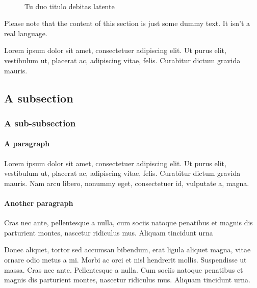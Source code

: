 \begin{figure}
\centering
{} \quad
{} \\
 \quad
{}
\caption[Tu duo titulo debitas latente]{Tu duo titulo debitas latente}
\label{fig:example}
\end{figure}

Please note that the content of this section is just some dummy text. It isn't a real language.

Lorem ipsum dolor sit amet, consectetuer adipiscing elit. Ut purus elit, vestibulum ut, placerat ac, adipiscing vitae, felis. Curabitur dictum gravida mauris.

\subsection*{A subsection}

\lipsum[2]

\subsubsection*{A sub-subsection}

\lipsum[7]

\paragraph{A paragraph}
Lorem ipsum dolor sit amet, consectetuer adipiscing elit. Ut purus elit, vestibulum ut, placerat ac, adipiscing vitae, felis. Curabitur dictum gravida mauris. Nam arcu libero, nonummy eget, consectetuer id, vulputate a, magna.

\paragraph{Another paragraph}
Cras nec ante, pellentesque a nulla, cum sociis natoque penatibus et magnis dis parturient montes, nascetur ridiculus mus. Aliquam tincidunt urna

\bigskip

Donec aliquet, tortor sed accumsan bibendum, erat ligula aliquet magna, vitae ornare odio metus a mi. Morbi ac orci et nisl hendrerit mollis. Suspendisse ut massa. Cras nec ante. Pellentesque a nulla. Cum sociis natoque penatibus et magnis dis parturient montes, nascetur ridiculus mus. Aliquam tincidunt urna.

